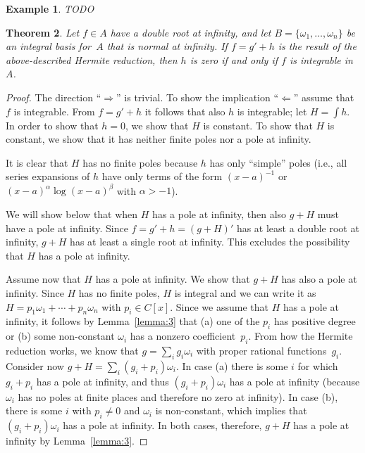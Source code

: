 \documentclass{sig-alternate}
\newtheorem{theorem}{Theorem}
\newtheorem{example}[theorem]{Example}
\begin{document}
\begin{example}
TODO
\end{example}

\begin{theorem}
Let $f\in A$ have a double root at
infinity, and let $B=\{\omega_1,\ldots,\omega_n\}$ be an integral basis for~$A$
that is normal at infinity.
If $f=g'+h$ is the result of the above-described Hermite reduction,
then $h$ is zero if and only if $f$ is integrable in~$A$.
\end{theorem}
\begin{proof}
The direction ``$\Rightarrow$'' is trivial. To show the implication
``$\Leftarrow$'' assume that $f$ is integrable. From $f=g'+h$ it follows that
also $h$ is integrable; let $H=\int h$.  In order to show that $h=0$, we show
that $H$ is constant.  To show that $H$ is constant, we show that it has
neither finite poles nor a pole at infinity.

It is clear that $H$ has no finite poles because $h$ has only ``simple'' poles
(i.e., all series expansions of $h$ have only terms of the form
$(x-a)^{-1}$ or $(x-a)^\alpha\log(x-a)^\beta$ with $\alpha>-1$).

We will show below that when $H$ has a pole at infinity, then also $g+H$ must
have a pole at infinity.  Since $f=g'+h=(g+H)'$ has at least a double root at
infinity, $g+H$ has at least a single root at infinity. This excludes the
possibility that $H$ has a pole at infinity.

Assume now that $H$ has a pole at infinity. We show that $g+H$ has also a pole at infinity.
Since $H$ has no finite poles, $H$ is integral and we can write it as
$H=p_1\omega_1+\cdots+p_n\omega_n$ with $p_i\in C[x]$.
Since we assume that $H$ has a pole at infinity, it follows by Lemma~\ref{lemma:3} that
(a) one of the $p_i$ has positive degree or
(b) some non-constant $\omega_i$ has a nonzero coefficient~$p_i$.
From how the Hermite reduction works, we know that $g=\sum_i g_i\omega_i$
with proper rational functions~$g_i$. Consider now $g+H=\sum_i (g_i+p_i)\omega_i$.
In case (a) there is some $i$ for which $g_i+p_i$ has a pole at infinity,
and thus $(g_i+p_i)\omega_i$ has a pole at infinity (because $\omega_i$ has
no poles at finite places and therefore no zero at infinity).
In case (b), there is some $i$ with $p_i\neq0$ and $\omega_i$ is non-constant,
which implies that $(g_i+p_i)\omega_i$ has a pole at infinity.
In both cases, therefore, $g+H$ has a pole at infinity by Lemma~\ref{lemma:3}.
\end{proof}
\end{document}
